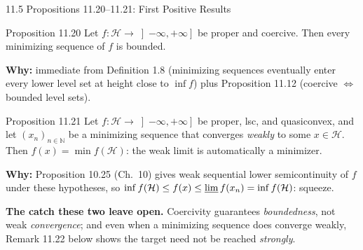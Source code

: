 \documentclass[aspectratio=169,10pt]{beamer}
\newcommand{\mHH}{\mathcal H}
\begin{document}
\begin{frame}{11.5 Propositions 11.20--11.21: First Positive Results}

  \begin{block}{Proposition 11.20}
    Let $f:\mHH\to\left]-\infty,+\infty\right]$ be proper and
    coercive. Then every minimizing sequence of $f$ is bounded.
  \end{block}
  \textbf{Why:} immediate from Definition 1.8 (minimizing sequences
  eventually enter every lower level set at height close to
  $\inf f$) plus Proposition 11.12 (coercive $\iff$ bounded level
  sets).

  \begin{block}{Proposition 11.21}
    Let $f:\mHH\to\left]-\infty,+\infty\right]$ be proper, lsc, and
    quasiconvex, and let $(x_n)_{n\in\mathbb N}$ be a minimizing
    sequence that converges \emph{weakly} to some $x\in\mHH$. Then
    $f(x)=\min f(\mHH)$: the weak limit is automatically a minimizer.
  \end{block}
  \textbf{Why:} Proposition 10.25 (Ch.\ 10) gives weak sequential
  lower semicontinuity of $f$ under these hypotheses, so
  $\inf f(\mHH)\le f(x)\le\varliminf f(x_n)=\inf f(\mHH)$: squeeze.

  \textbf{The catch these two leave open.} Coercivity guarantees
  \emph{boundedness}, not weak \emph{convergence}; and even when a
  minimizing sequence does converge weakly, Remark 11.22 below shows
  the target need not be reached \emph{strongly}.

\end{frame}
\end{document}
